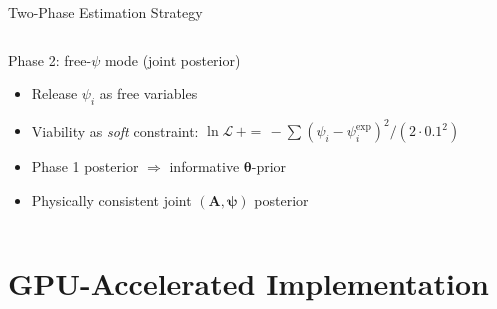\documentclass[aspectratio=169,10pt,t]{beamer}
\newcommand{\btheta}{\boldsymbol{\theta}}
\newcommand{\bpsi}{\boldsymbol{\psi}}
\begin{document}
\begin{frame}[t]{Two-Phase Estimation Strategy}
\begin{columns}[T]
\begin{block}{Phase 2: free-$\psi$ mode (joint posterior)}
        \begin{itemize}\setlength{\itemsep}{2pt}
          \item Release $\psi_i$ as free variables
          \item Viability as \emph{soft} constraint:
                $\ln\mathcal{L}\,{+}{=}\,-\sum(\psi_i-\psi_i^{\exp})^2/(2\cdot0.1^2)$
          \item Phase 1 posterior $\Rightarrow$ informative $\btheta$-prior
          \item Physically consistent joint $(\mathbf{A},\bpsi)$ posterior
        \end{itemize}
      \end{block}
  \end{columns}
\end{frame}

\section{GPU-Accelerated Implementation}
\end{document}

